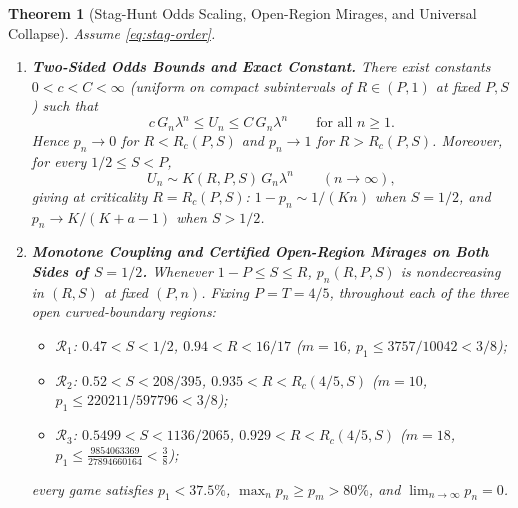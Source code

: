 \documentclass[11pt,reqno]{amsart}
\newtheorem{theorem}{Theorem}[section]
\theoremstyle{definition}
\theoremstyle{remark}
\begin{document}
\begin{theorem}[Stag-Hunt Odds Scaling, Open-Region Mirages, and Universal Collapse]\label{thm:staghunt}
Assume \eqref{eq:stag-order}.
\begin{enumerate}
  \item \textbf{Two-Sided Odds Bounds and Exact Constant.} There exist constants $0 < c < C < \infty$ (uniform on compact subintervals of $R \in (P,1)$ at fixed $P,S$) such that
  \begin{equation}\label{eq:stag-bounds}
    c\, G_n \lambda^n \le U_n \le C\, G_n \lambda^n \qquad \text{for all } n \ge 1.
  \end{equation}
  Hence $p_n \to 0$ for $R < R_c(P,S)$ and $p_n \to 1$ for $R > R_c(P,S)$. Moreover, for every $1/2 \le S < P$,
  \begin{equation}\label{eq:stag-asymp}
    U_n \sim K(R,P,S)\, G_n \lambda^n \qquad (n \to \infty),
  \end{equation}
  giving at criticality $R = R_c(P,S)$: $1 - p_n \sim 1/(K n)$ when $S = 1/2$, and $p_n \to K/(K + a - 1)$ when $S > 1/2$.

  \item \textbf{Monotone Coupling and Certified Open-Region Mirages on Both Sides of $S=1/2$.} Whenever $1-P \le S \le R$, $p_n(R,P,S)$ is nondecreasing in $(R,S)$ at fixed $(P,n)$. Fixing $P = T = 4/5$, throughout each of the three open curved-boundary regions:
  \begin{itemize}
    \item $\mathcal{R}_1$: $0.47 < S < 1/2$, $0.94 < R < 16/17$ ($m = 16$, $p_1 \le 3757/10042 < 3/8$);
    \item $\mathcal{R}_2$: $0.52 < S < 208/395$, $0.935 < R < R_c(4/5,S)$ ($m = 10$, $p_1 \le 220211/597796 < 3/8$);
    \item $\mathcal{R}_3$: $0.5499 < S < 1136/2065$, $0.929 < R < R_c(4/5,S)$ ($m = 18$, $p_1 \le \frac{9854063369}{27894660164} < \frac{3}{8}$);
  \end{itemize}
  every game satisfies $p_1 < 37.5\%$, $\max_n p_n \ge p_m > 80\%$, and $\lim_{n\to\infty} p_n = 0$.


\end{enumerate}
\end{theorem}
\end{document}
